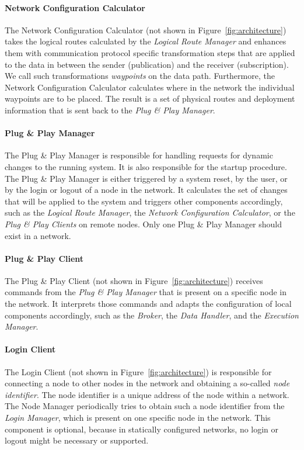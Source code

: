 \paragraph{Network Configuration Calculator}
The Network Configuration Calculator (not shown in Figure~\ref{fig:architecture}) takes the logical routes calculated by the \emph{Logical Route Manager}
and enhances them with communication protocol specific transformation steps that are applied to the data
in between the sender (publication) and the receiver (subscription).
We call such transformations \emph{waypoints} on the data path.
Furthermore, the Network Configuration Calculator calculates where in the network the individual waypoints are to be placed.
The result is a set of physical routes and deployment information that is sent back to the \emph{Plug \& Play Manager}.

\paragraph{Plug \& Play Manager}
The Plug \& Play Manager is responsible for handling requests for dynamic changes to the running system.
It is also responsible for the startup procedure.
The Plug \& Play Manager is either triggered by a system reset, by the user, or by the login or logout of a node in the network.
It calculates the set of changes that will be applied to the system and triggers other components accordingly,
such as the \emph{Logical Route Manager}, the \emph{Network Configuration Calculator}, or the \emph{Plug \& Play Clients} on remote nodes.
Only one Plug \& Play Manager should exist in a network.

\paragraph{Plug \& Play Client}
The Plug \& Play Client (not shown in Figure~\ref{fig:architecture}) receives commands from the \emph{Plug \& Play Manager} that is present on a specific node in the network.
It interprets those commands and adapts the configuration of local components accordingly, such as the \emph{Broker}, the \emph{Data Handler}, and the \emph{Execution Manager}.

\paragraph{Login Client}
The Login Client (not shown in Figure~\ref{fig:architecture}) is responsible for connecting a node
to other nodes in the network and obtaining a so-called \emph{node identifier}.
The node identifier is a unique address of the node within a network.
The Node Manager periodically tries to obtain such a node identifier from the \emph{Login Manager},
which is present on one specific node in the network.
%
This component is optional, because in statically configured networks, no login or logout might be necessary or supported.

